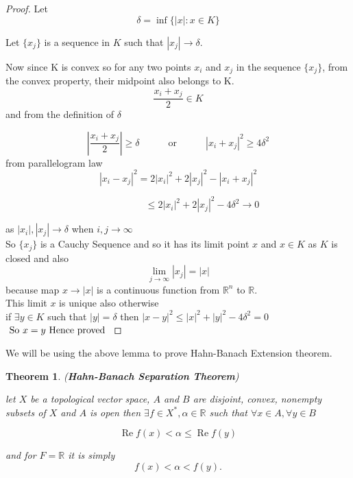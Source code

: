 \documentclass[oneside]{book}
\newtheorem{theorem}{Theorem}[section]
\begin{document}
	\begin{proof}
		
		Let
		\[
		\delta=\inf \{|x|: x \in K\} 
		\]
		
		Let $\{x_{j}\}$ is a sequence in $K$ such that    $ |x_{j}| \rightarrow \delta $.
		
		Now since K is convex so for any two points $x_{i}$ and $x_{j}$ in the sequence  $\{x_{j}\}$, from the convex property, their midpoint also belongs to K.
		\[
		\frac{x_{i}+x_{j}}{2} \in K
		\]
		and from the definition
		of $\delta$
		
		\[
		\left|\frac{x_{i}+x_{j}}{2}\right| \geq \delta
		\quad \quad \quad \text{or} \quad \quad \quad 
		\left|x_{i}+x_{j}\right|^{2} \geq 4{\delta}^{2}
		\]
		from parallelogram law 
		\[
		\left|x_{i} - x_{j} \right|^{2} = 
		2\left|x_{i}\right|^{2}+2\left|x_{j}\right|^{2} - \left|x_{i}+x_{j}\right|^{2}
		\]
		
		\[ 
		\quad \quad\quad\quad\quad \leq 
		2\left|x_{i}\right|^{2}+2|x_{j}|^{2}-4 \delta^{2} \rightarrow 0
		\]
		
		as $\left|x_{i}\right|,\left|x_{j}\right| \rightarrow  \delta$ when $i, j \rightarrow \infty$ \\
		So $\{x_{j}\}$ is a Cauchy Sequence and so it has its limit point $x$ and $x \in K$ as $K$ is closed and also 
		$$  \lim_{j \rightarrow \infty }|x_{j}| = |x|$$
		because map $x \rightarrow |x|$ is a continuous function from $\mathbb{R}^n$ to $\mathbb{R}$.    \\
		
		This limit $x$   is unique also otherwise \\
		
		
		if $\exists y \in K $ such that 
		$\left|y\right| = \delta $
		then
		$\left|x-y\right|^{2} \leq \left|x\right|^{2}+\left|y\right|^{2} -4 {\delta}^{2} = 0$ \\
		$\text{ So } x = y \\
		\text{ Hence proved }$
		
		
	\end{proof}
	
	We will be using the above lemma to prove Hahn-Banach Extension theorem.
	
	\hfill \break
	\begin{theorem}(\textbf{Hahn-Banach Separation Theorem})
		\label{t:0.1}
		
		\hfill \break
		let $X$ be a topological vector space, $A$ and $B$ are disjoint, convex, nonempty subsets 
		of $X$ and $A$ is open then $ \exists  f  \in X^{*}, \alpha \in \mathbb{R}$ such that
		$\forall  x \in A, \forall  y \in B$
		
		$$ \operatorname{Re}f(x) <\alpha \leq \operatorname{Re} f(y)$$
		
		and    for $F =\mathbb{R}$ it is  simply
		$$f(x)<\alpha < f(y).$$
	\end{theorem}
	
\end{document}
